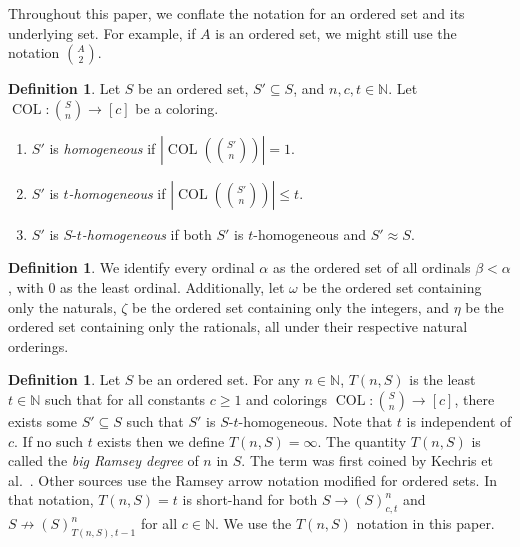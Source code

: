 \documentclass[10pt,a4paper]{article}
\newcommand{\oequiv}{\approx}
\newcommand{\COL}{\operatorname{COL}}
\newcommand{\N}{\mathbb{N}}
\newcommand{\numpoints}{n}
\newcommand{\numcolors}{c}
\theoremstyle{plain}
\theoremstyle{definition}
\newtheorem{definition}[theorem]{Definition}
\begin{document}
Throughout this paper, we conflate the notation for an ordered set and its underlying set. 
For example, if $A$ is an ordered set, we might still use the notation $\binom{A}{2}$.

\begin{definition}\label{def:homogeneous}
Let $S$ be an ordered set, $S'\subseteq S$, and $\numpoints,\numcolors,t \in \N.$ Let $\COL \colon \binom{S}{\numpoints} \to [\numcolors]$ be a coloring.
\begin{enumerate}
    \item 
$S'$ is \textit{homogeneous} if  $\left|\COL\left(\binom{S'}{\numpoints}\right)\right|= 1$. 
\item 
 $S'$ is \textit{$t$-homogeneous} if $\left|\COL\left(\binom{S'}{\numpoints}\right)\right|\leq t$. 
 \item 
$S'$ is $S$-\textit{$t$-homogeneous} if both $S'$ is $t$-homogeneous and $S'\oequiv S$.
\end{enumerate}
\end{definition}

\begin{definition}
We identify every ordinal $\alpha$ as the ordered set of all ordinals $\beta < \alpha$, with 0 as the least ordinal. Additionally, let $\omega$ be the ordered set containing only the naturals, $\zeta$ be the ordered set containing only the integers, and $\eta$ be the ordered set containing only the rationals, all under their respective natural orderings.

\end{definition}

\begin{definition}\label{def:T}
Let $S$ be an ordered set.
For any $\numpoints\in \N$, $T(\numpoints,S)$
is the least $t\in \N$ such that for all constants $\numcolors \geq 1$ and
colorings  $\COL \colon \binom{S}{\numpoints} \to [\numcolors]$, there exists some $S' \subseteq S$ 
such that $S'$ is $S$-$t$-homogeneous.
Note that $t$ is independent of $\numcolors$.
If no such $t$ exists then we define $T(\numpoints,S)=\infty$. 
The quantity $T(\numpoints,S)$ is called the \textit{big Ramsey degree} of $\numpoints$ in $S$.
The term was first coined by Kechris et al.~\cite{KPT-2005}. Other sources use the Ramsey arrow notation modified for ordered sets. In that notation, $T(\numpoints,S)=t$ is short-hand for both
$S \to (S)^{\numpoints}_{\numcolors,t}$ and $S \not \to
(S)^{\numpoints}_{T(\numpoints,S),t-1}$ for all $\numcolors \in \N.$
We use the $T(n, S)$ notation in this paper.
\end{definition}
\end{document}
